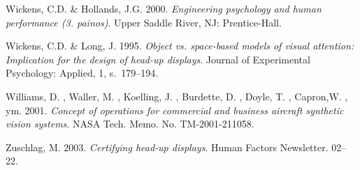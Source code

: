 \documentclass[utf8,bachelor,manualbib]{gradu3}
\begin{document}
\begin{thebibliography}{}
Wickens, C.D. \& Hollands, J.G. 2000.
\textit{Engineering psychology and human performance (3. painos)}.
Upper Saddle River, NJ: Prentice-Hall.

Wickens, C.D. \& Long, J. 1995.
\textit{Object vs. space-based models of visual attention: Implication for the design of head-up displays}.
Journal of Experimental Psychology: Applied, 1, s.~179--194.

Williams, D. , Waller, M. , Koelling, J. , Burdette, D. , Doyle, T. , Capron,W. , ym. 2001.
\textit{Concept of operations for commercial and business aircraft synthetic vision systems}.
NASA Tech. Memo. No. TM-2001-211058.

Zuschlag, M. 2003.
\textit{Certifying head-up displays}.
Human Factors Newsletter. 02--22.

\end{thebibliography}
\end{document}

